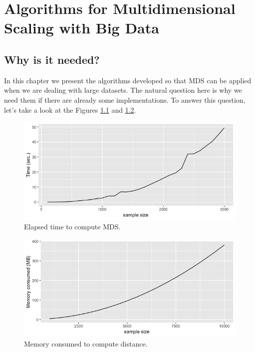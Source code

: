 \documentclass[11pt]{report}
\begin{document}
\chapter{Algorithms for Multidimensional Scaling with Big Data}
\label{alg_mds}

\section{Why is it needed?}
In this chapter we present the algorithms developed so that MDS can be applied
when we are dealing with large datasets. The natural question here is why we need 
them if there are already some implementations. To answer this question, let's 
take a look at the Figures \ref{elapsed_time_mds} and \ref{memory_distance}.

 
\begin{figure}[!ht]
\centering
    \includegraphics[scale = 0.5]{./images/elapsed_time_mds.png}
    \caption{Elapsed time to compute MDS.}
    \label{elapsed_time_mds}
\end{figure}



\begin{figure}[!ht]
\centering
\includegraphics[scale = 0.5]{./images/memory_distance.png}
\caption{Memory consumed to compute distance.}
\label{memory_distance}
\end{figure}
\end{document}

